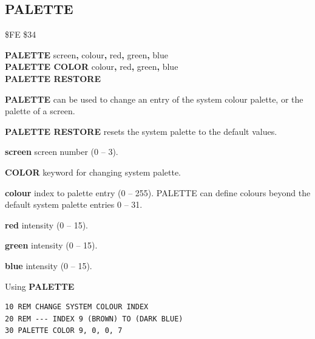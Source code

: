
\newpage
\subsection{PALETTE}
\begin{description}[leftmargin=2cm,style=nextline]
\item [Token:]    \$FE \$34

\item [Format:]   {\bf PALETTE} screen{\bf,} colour{\bf,} red{\bf,} green{\bf,} blue \\
                  {\bf PALETTE COLOR} colour{\bf,} red{\bf,} green{\bf,} blue \\
                  {\bf PALETTE RESTORE}

\item [Usage:]    {\bf PALETTE} can be used to change an entry of the system colour palette, or the palette of a screen.

                  {\bf PALETTE RESTORE} resets the system palette to the default values.

                  {\bf screen} screen number (0 -- 3).

                  {\bf COLOR} keyword for changing system palette.

                  {\bf colour} index to palette entry (0 -- 255). PALETTE can define colours beyond the default system palette entries 0 -- 31.

                  {\bf red} intensity (0 -- 15).

                  {\bf green} intensity (0 -- 15).

                  {\bf blue} intensity (0 -- 15).

\item [Examples:] Using {\bf PALETTE}

\begin{tcolorbox}[colback=black,coltext=white]
\verbatimfont{\codefont}
\begin{verbatim}
10 REM CHANGE SYSTEM COLOUR INDEX
20 REM --- INDEX 9 (BROWN) TO (DARK BLUE)
30 PALETTE COLOR 9, 0, 0, 7
\end{verbatim}
\end{tcolorbox}


\end{description}
